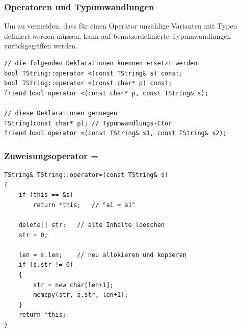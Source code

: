\subsubsection{Operatoren und Typumwandlungen}
Um zu vermeiden, dass für einen Operator unzählige Varianten mit Typen definiert werden müssen, kann auf benutzerdefinierte Typumwandlungen zurückgegriffen werden.
\begin{minipage}{0.8\linewidth}
\vspace{-\baselineskip}
\begin{lstlisting}
// die folgenden Deklarationen koennen ersetzt werden
bool TString::operator <(const TString& s) const;
bool TString::operator <(const char* p) const;
friend bool operator <(const char* p, const TString& s);

// diese Deklarationen genuegen
TString(const char* p); // Typumwandlungs-Ctor
friend bool operator <(const TString& s1, const TString& s2);
\end{lstlisting}
\end{minipage}

\subsubsection{Zuweisungsoperator =}
\label{sec:zuweisungsoperator}
\vspace{-\baselineskip}
\begin{minipage}{0.6\linewidth}
\begin{lstlisting}
TString& TString::operator=(const TString& s)
{
	if (this == &s)
		return *this;	// "a1 = a1"
	
	delete[] str;	// alte Inhalte loeschen
	str = 0;
	
	len = s.len;	// neu allokieren und kopieren
	if (s.str != 0)
	{
		str = new char[len+1];
		memcpy(str, s.str, len+1);
	}
	return *this;
}
\end{lstlisting}
\end{minipage}

